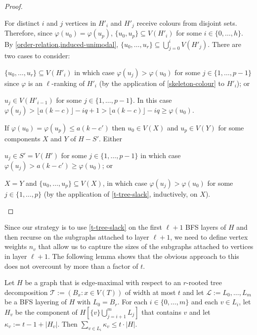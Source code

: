 \documentclass[kpfonts]{patmorin}
\theoremstyle{named}
\begin{document}
\begin{proof}
\begin{compactenum}
        For distinct $i$ and $j$ vertices in $H'_i$ and $H'_j$ receive colours from disjoint sets.  Therefore, since $\varphi(u_0)=\varphi(u_p)$,  $\{u_0,u_p\}\subseteq V(H'_i)$ for some $i\in\{0,\ldots,h\}$.  By \cref{order-relation,induced-unimodal}, $\{u_0,\ldots,u_{r}\}\subseteq \bigcup_{j=0}^{i} V(H'_j)$.  There are two cases to consider:
        \begin{compactenum}
           \item $\{u_0,\ldots,u_{r}\}\subseteq V(H'_i)$ in which case $\varphi(u_j)>\varphi(u_0)$ for some $j\in\{1,\ldots,p-1\}$ since $\varphi$ is an $\ell$-ranking of $H'_i$ (by the application of \cref{skeleton-colour} to $H'_i$); or
           \item $u_j\in V(H'_{i-1})$ for some $j\in\{1,\ldots,p-1\}$.  In this case $\varphi(u_j)>\lfloor a(k-c)\rfloor-iq + 1 > \lfloor a(k-c)\rfloor-iq \ge \varphi(u_0)$.
       \end{compactenum}
       \item If $\varphi(u_0)=\varphi(u_p) \le a(k-c')$ then $u_0\in V(X)$ and $u_p\in V(Y)$ for some components $X$ and $Y$ of $H-S'$.  Either
       \begin{compactenum}
            \item $u_j\in S'=V(H')$ for some $j\in\{1,\ldots,p-1\}$ in which case $\varphi(u_j)>a(k-c')\ge\varphi(u_0)$; or
            \item $X=Y$ and $\{u_0,\ldots,u_p\}\subseteq V(X)$, in which case $\varphi(u_j)>\varphi(u_0)$ for some $j\in\{1,\ldots,p\}$ (by the application of \cref{t-tree-slack}, inductively, on $X$). \qedhere
        \end{compactenum}
    \end{compactenum}
\end{proof}

Since our strategy is to use \cref{t-tree-slack} on the first $\ell+1$ BFS layers of $H$ and then recurse on the subgraphs attached to layer $\ell+1$, we need to define vertex weights $n_v$ that allow us to capture the sizes of the subgraphs attached to vertices in layer $\ell+1$.  The following lemma shows that the obvious approach to this does not overcount by more than a factor of $t$.

\begin{lem}\label{size-claim}
    Let $H$ be a graph that is edge-maximal with respect to an $r$-rooted tree decomposition $\mathcal{T}:=(B_x:x\in V(T))$ of width at most $t$ and let $\mathcal{L}:=L_0,\ldots,L_m$ be a BFS layering of $H$ with $L_0=B_r$.  For each $i\in\{0,\ldots,m\}$ and each $v\in L_i$, let $H_v$ be the component of $H[\{v\}\bigcup_{j=i+1}^m L_j]$ that contains $v$ and let $\kappa_v:= t-1+|H_v|$.  Then $\sum_{v\in L_i} \kappa_v \le t\cdot|H|$.
\end{lem}
\end{document}
